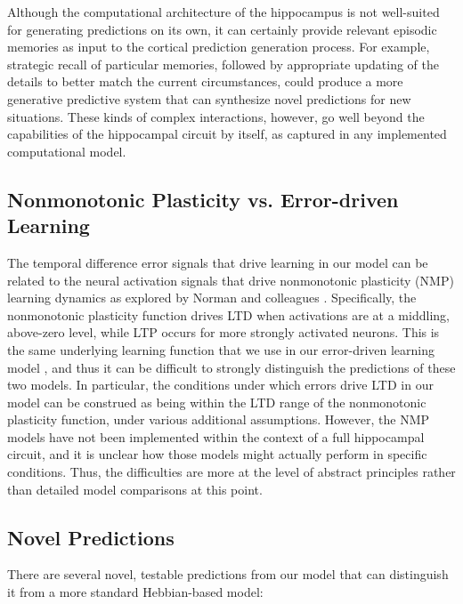 \documentclass[11pt,twoside]{article}
\newif\myifpdf
\begin{document}
Although the computational architecture of the hippocampus is not well-suited for generating predictions on its own, it can certainly provide relevant episodic memories as input to the cortical prediction generation process.  For example, strategic recall of particular memories, followed by appropriate updating of the details to better match the current circumstances, could produce a more generative predictive system that can synthesize novel predictions for new situations. These kinds of complex interactions, however, go well beyond the capabilities of the hippocampal circuit by itself, as captured in any implemented computational model.

\subsection{Nonmonotonic Plasticity vs. Error-driven Learning}

The temporal difference error signals that drive learning in our model can be related to the neural activation signals that drive nonmonotonic plasticity (NMP) learning dynamics as explored by Norman and colleagues \citep{RitvoTurk-BrowneNorman19}.  Specifically, the nonmonotonic plasticity function drives LTD when activations are at a middling, above-zero level, while LTP occurs for more strongly activated neurons.  This is the same underlying learning function that we use in our error-driven learning model \citep{OReillyMunakataFrankEtAl12}, and thus it can be difficult to strongly distinguish the predictions of these two models.  In particular, the conditions under which errors drive LTD in our model can be construed as being within the LTD range of the nonmonotonic plasticity function, under various additional assumptions.  However, the NMP models have not been implemented within the context of a full hippocampal circuit, and it is unclear how those models might actually perform in specific conditions.  Thus, the difficulties are more at the level of abstract principles rather than detailed model comparisons at this point.

\subsection{Novel Predictions}

There are several novel, testable predictions from our model that can distinguish it from a more standard Hebbian-based model:
\end{document}
